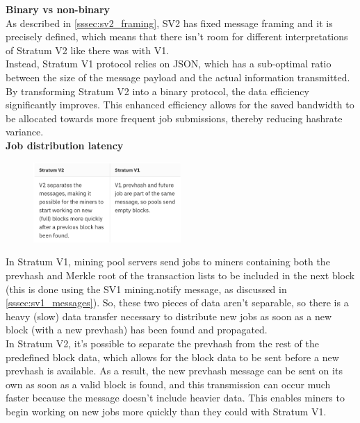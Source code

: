 \noindent\textbf{Binary vs non-binary}\\
As described in \ref{sssec:sv2_framing}, SV2 has fixed message framing and it is precisely defined, which means that there isn't room for different interpretations of Stratum V2 like there was with V1. \\
Instead, Stratum V1 protocol relies on JSON, which has a sub-optimal ratio between the size of the message payload and the actual information transmitted. By transforming Stratum V2 into a binary protocol, the data efficiency significantly improves. This enhanced efficiency allows for the saved bandwidth to be allocated towards more frequent job submissions, thereby reducing hashrate variance.\\

\noindent\textbf{Job distribution latency}\label{sv2_jdl}

\begin{figure}
    \centering
    \includegraphics[width=0.5\textwidth]{Figures/sv2/sv2_6.png}
\end{figure}
\noindent In Stratum V1, mining pool servers send jobs to miners containing both the prevhash and Merkle root of the transaction lists to be included in the next block (this is done using the SV1 mining.notify message, as discussed in \ref{sssec:sv1_messages}).
So, these two pieces of data aren't separable, so there is a heavy (slow) data transfer necessary to distribute new jobs as soon as a new block (with a new prevhash) has been found and propagated. \\
In Stratum V2, it's possible to separate the prevhash from the rest of the predefined block data, which allows for the block data to be sent before a new prevhash is available. As a result, the new prevhash message can be sent on its own as soon as a valid block is found, and this transmission can occur much faster because the message doesn't include heavier data. This enables miners to begin working on new jobs more quickly than they could with Stratum V1.\\


